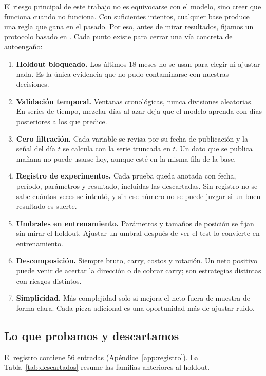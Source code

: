 \documentclass[10pt,a4paper]{article}
\begin{document}
El riesgo principal de este trabajo no es equivocarse con el modelo, sino creer
que funciona cuando no funciona. Con suficientes intentos, cualquier base produce
una regla que gana en el pasado. Por eso, antes de mirar resultados, fijamos un
protocolo basado en \citet{lopezdeprado2018}. Cada punto existe para cerrar una
vía concreta de autoengaño:
\begin{enumerate}
  \item \textbf{Holdout bloqueado.} Los últimos 18 meses no se usan para elegir
        ni ajustar nada. Es la única evidencia que no pudo contaminarse con
        nuestras decisiones.
  \item \textbf{Validación temporal.} Ventanas cronológicas, nunca divisiones
        aleatorias. En series de tiempo, mezclar días al azar deja que el modelo
        aprenda con días posteriores a los que predice.
  \item \textbf{Cero filtración.} Cada variable se revisa por su fecha de
        publicación y la señal del día $t$ se calcula con la serie truncada en $t$.
        Un dato que se publica mañana no puede usarse hoy, aunque esté en la misma
        fila de la base.
  \item \textbf{Registro de experimentos.} Cada prueba queda anotada con fecha,
        período, parámetros y resultado, incluidas las descartadas. Sin registro
        no se sabe cuántas veces se intentó, y sin ese número no se puede juzgar si
        un buen resultado es suerte.
  \item \textbf{Umbrales en entrenamiento.} Parámetros y tamaños de posición se
        fijan sin mirar el holdout. Ajustar un umbral después de ver el test lo
        convierte en entrenamiento.
  \item \textbf{Descomposición.} Siempre bruto, carry, costos y rotación. Un neto
        positivo puede venir de acertar la dirección o de cobrar carry; son
        estrategias distintas con riesgos distintos.
  \item \textbf{Simplicidad.} Más complejidad solo si mejora el neto fuera de
        muestra de forma clara. Cada pieza adicional es una oportunidad más de
        ajustar ruido.
\end{enumerate}

\subsection{Lo que probamos y descartamos}\label{sec:descartados}

El registro contiene 56 entradas (Apéndice~\ref{app:registro}). La
Tabla~\ref{tab:descartados} resume las familias anteriores al holdout.
\end{document}
